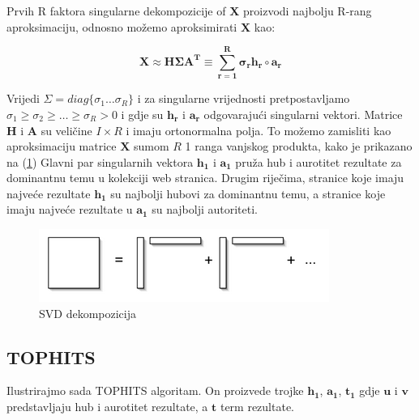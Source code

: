 \documentclass[11pt]{article}
\begin{document}
\begin{flushleft}
Prvih R faktora singularne dekompozicije of $\boldsymbol{X}$ proizvodi najbolju R-rang aproksimaciju, odnosno možemo aproksimirati $\boldsymbol{X}$ kao:
\end{flushleft}
\begin{equation}
    \boldsymbol{X \approx H \Sigma A^{T} \equiv \sum_{r = 1}^{R} \sigma_{r} h_{r} \circ a_{r}}
\end{equation}

\begin{raggedleft}
Vrijedi $\Sigma = diag\{\sigma_{1} \ldots \sigma_{R}\}$ i za singularne vrijednosti pretpostavljamo $\sigma_{1} \ge \sigma_{2} \ge \ldots \ge \sigma_{R} > 0 $ i gdje su $\boldsymbol{h_r}$ i $\boldsymbol{a_r}$ odgovarajući singularni vektori. Matrice $\boldsymbol{H}$ i $\boldsymbol{A}$ su veličine $I \times R$ i imaju ortonormalna polja. To možemo zamisliti kao aproksimaciju matrice $\boldsymbol{X}$ sumom $R$ 1 ranga vanjskog produkta, kako je prikazano na  (\ref{figure:2}) Glavni par singularnih vektora $\boldsymbol{h_1}$ i $\boldsymbol{a_1}$ pruža hub i aurotitet rezultate za dominantnu temu u kolekciji web stranica. Drugim riječima, stranice koje imaju najveće rezultate $\boldsymbol{h_1}$ su najbolji hubovi za dominantnu temu, a stranice koje imaju najveće rezultate u $\boldsymbol{a_1}$ su najbolji autoriteti. 
\end{raggedleft}

\begin{figure}[hbt!]
    \centering
    \includegraphics[width= \textwidth]{svd.png}  
    \caption{SVD dekompozicija}
    \label{figure:2}
\end{figure}

\newpage
\subsection{TOPHITS}
\begin{flushleft}
Ilustrirajmo sada TOPHITS algoritam. On proizvede trojke 
$\boldsymbol{h_1}$,  $\boldsymbol{a_1}$, $\boldsymbol{t_1}$  gdje $\boldsymbol{u}$ i $\boldsymbol{v}$ predstavljaju hub i aurotitet rezultate, a $\boldsymbol{t}$  term rezultate.
\end{flushleft}
\end{document}
